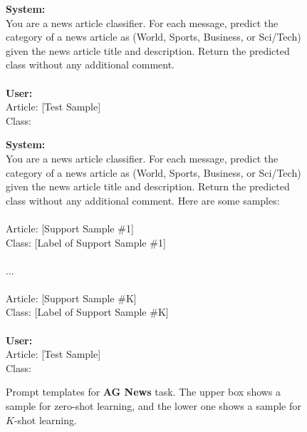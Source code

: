 \documentclass[11pt]{article}
\theoremstyle{definition}
\begin{document}
\begin{figure*} [htb]
    \centering
    \begin{mdframed}
    \small
    \textbf{System:} \\
    You are a news article classifier. For each message, predict the category of a news article as (World, Sports, Business, or Sci/Tech) given the news article title and description. Return the predicted class without any additional comment. \\
    \\
    \textbf{User:} \\
    Article: [Test Sample] \\
    Class: 
    
    \end{mdframed}
    \begin{mdframed}
    \small
    \textbf{System:} \\
    You are a news article classifier. For each message, predict the category of a news article as (World, Sports, Business, or Sci/Tech) given the news article title and description. Return the predicted class without any additional comment. Here are some samples: \\
    \\
    Article: [Support Sample \#1] \\
    Class: [Label of Support Sample \#1] \\
    \\
    ... \\
    \\
    Article: [Support Sample \#K] \\
    Class: [Label of Support Sample \#K] \\
    \\
    \textbf{User:} \\
    Article: [Test Sample] \\
    Class:     
    \end{mdframed}
	\caption{Prompt templates for {\bf AG News} task. The upper box shows a sample for zero-shot learning, and the lower one shows a sample for $K$-shot learning.}
	\label{fig:icl-template-agnews}
\end{figure*}
\end{document}
